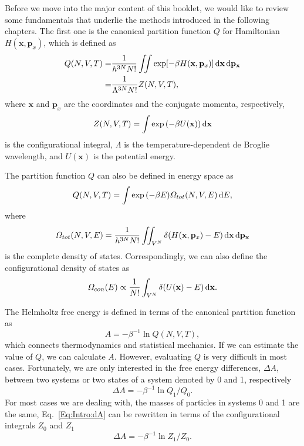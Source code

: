 Before we move into the major content of this booklet, we would like to review some fundamentals that underlie the methods introduced in the following chapters. The first one is the canonical partition function $Q$ for Hamiltonian $H(\mathbf{x},\mathbf{p}_{x})$, which is defined as
\begin{align}
  Q(N,V,T)=&\frac{1}{{h}^{3N}N!} \iint \exp[-\beta H(\mathbf{x},\mathbf{p}_{x})] \mathop{}\!\mathrm{d}\mathbf{x}\mathop{}\!\mathrm{d}\mathbf{p}_\mathbf{x}\notag\\
         =&\frac{1}{\Lambda^{3N}N!}Z(N,V,T),
\end{align}
where $\mathbf{x}$ and $\mathbf{p}_{x}$ are the coordinates and the conjugate momenta, respectively,
\begin{equation}
	Z(N,V,T)=\int \exp{\left(-\beta U(\mathbf{x})\right)}\mathop{}\!\mathrm{d}\mathbf{x}
\end{equation}
is the configurational integral, $\Lambda$ is the temperature-dependent de Broglie wavelength, and $U(\mathbf{x})$ is the potential energy.

The partition function $Q$ can also be defined in energy space as
\begin{equation}
	Q(N,V,T)=\int \exp{\left(-\beta E\right)}\varOmega_{tot}(N,V,E)\mathop{}\!\mathrm{d} E,
\end{equation}
where
\begin{equation}
	\varOmega_{tot}(N,V,E)=\frac{1}{{h}^{3N}N!}\iint_{V^N} \delta(H(\mathbf{x},\mathbf{p}_{x})-E)\mathop{}\!\mathrm{d}\mathbf{x}\mathop{}\!\mathrm{d}\mathbf{p}_\mathbf{x}
\end{equation}
is the complete density of states. Correspondingly, we can also define the configurational density of states as
\begin{equation}
	\varOmega_{con}(E)\propto\frac{1}{N!}\int_{V^N} \delta(U(\mathbf{x})-E)\mathop{}\!\mathrm{d}\mathbf{x}.
\end{equation}

The Helmholtz free energy is defined in terms of the canonical partition function as
\begin{equation}
A=-\beta^{-1}\ln{Q(N,V,T)},
\end{equation}
which connects thermodynamics and statistical mechanics. If we can estimate the value of $Q$, we can calculate $A$. However, evaluating $Q$ is very difficult in most cases. Fortunately, we are only interested in the free energy differences, $\Delta A$, between two systems or two states of a system denoted by 0 and 1, respectively
\begin{equation}
\Delta A=-\beta^{-1}\ln{Q_1/Q_0}.
\label{Eq:Intro:dA}
\end{equation}
For most cases we are dealing with, the masses of particles in systems 0 and 1 are the same, Eq.~\ref{Eq:Intro:dA} can be rewritten in terms of the configurational integrals $Z_0$ and $Z_1$
\begin{equation}
\Delta A=-\beta^{-1}\ln{Z_1/Z_0}.
\end{equation}

